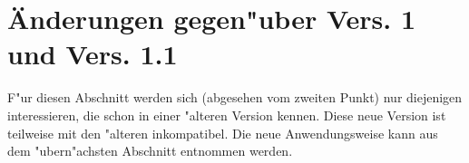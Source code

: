 \documentclass[11pt]{article}                    %
\begin{document}
  \nobreak\noindent\hrulefill

  \newpage
  \noindent\hrulefill
  \tableofcontents
  \vspace{1ex}\nobreak\noindent\hrulefill\vspace{2ex}


  \section{\"Anderungen gegen"uber Vers. 1 und Vers. 1.1}

  F"ur diesen Abschnitt werden sich (abgesehen vom zweiten Punkt) nur
  diejenigen interessieren, die \bibarts{} schon in einer "alteren Version
  kennen. Diese neue Version ist teilweise mit den "alteren inkompatibel.
  Die neue Anwendungsweise kann aus dem "ubern"achsten Abschnitt entnommen
  werden.
\end{document}
